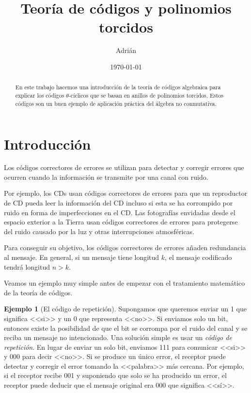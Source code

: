 \documentclass[a4paper,11pt]{article}
\title{Teoría de códigos y polinomios torcidos}
\author{Adrián}
\date{\today}
\numberwithin{equation}{section}
\theoremstyle{definition} %
\newtheorem{ejemplo}{Ejemplo}[section]
\begin{document}

    \maketitle

    \begin{abstract}
    En este trabajo hacemos una introducción de la teoría de códigos algebraica para explicar los códigos $\theta$-cíclicos que se basan en anillos de polinomios torcidos. Estos códigos son un buen ejemplo de aplicación práctica del álgebra no conmutativa.
    \end{abstract}

    \tableofcontents %

    \section{Introducción}


    Los códigos correctores de errores se utilizan para detectar y corregir errores que ocurren cuando la información se transmite por una canal con ruido.

    Por ejemplo, los CDs usan códigos correctores de errores para que un reproductor de CD pueda leer la información del CD incluso si esta se ha corrompido por ruido en forma de imperfecciones en el CD. Las fotografías envidadas desde el espacio exterior a la Tierra usan códigos correctores de errores  para protegerse del ruido causado por la luz y otras interrupciones atmosféricas.

    Para conseguir su objetivo, los códigos correctores de errores añaden redundancia al mensaje. En general, si un mensaje tiene longitud $k$, el mensaje codificado tendrá longitud $n > k$.

    Veamos un ejemplo muy simple antes de empezar con el tratamiento matemático de la teoría de códigos.

    \begin{ejemplo}[El código de repetición]
    \label{ej:codigo_repeticion}
        Supongamos que queremos enviar un 1 que significa <<si>>  y un 0 que representa <<no>>. Si enviamos solo un bit, entonces existe la posibilidad de que el bit se corrompa por el ruido del canal y se reciba un mensaje no intencionado. Una solución simple es usar un \emph{código de repetición}. En lugar de enviar un solo bit, enviamos 111 para comunicar <<si>> y 000 para decir <<no>>. Si se produce un único error, el receptor puede detectar y corregir el error tomando la <<palabra>> más cercana. Por ejemplo, si el receptor recibe 001 y suponiendo que solo se ha producido un error, el receptor puede deducir que el mensaje original era 000 que significa <<sí>>.
    \end{ejemplo}
\end{document}
